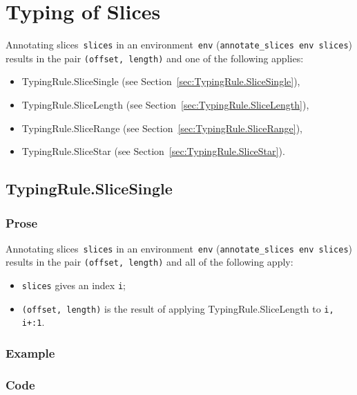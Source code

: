 \documentclass{book}
\begin{document}
\chapter{Typing of Slices}

Annotating slices~\texttt{slices} in an environment~\texttt{env}
(\texttt{annotate\_slices env slices}) results in the pair \texttt{(offset,
length)} and one of the following applies:
\begin{itemize}
\item TypingRule.SliceSingle (see Section~\ref{sec:TypingRule.SliceSingle}),
\item TypingRule.SliceLength (see Section~\ref{sec:TypingRule.SliceLength}),
\item TypingRule.SliceRange (see Section~\ref{sec:TypingRule.SliceRange}),
\item TypingRule.SliceStar (see Section~\ref{sec:TypingRule.SliceStar}).
\end{itemize}

\section{TypingRule.SliceSingle \label{sec:TypingRule.SliceSingle}}

  \subsection{Prose}
   Annotating slices~\texttt{slices} in an environment~\texttt{env}
(\texttt{annotate\_slices env slices}) results in the pair \texttt{(offset,
length)} and all of the following apply: 
   \begin{itemize}
   \item \texttt{slices} gives an index \texttt{i};
   \item \texttt{(offset, length)} is the result of applying TypingRule.SliceLength to \texttt{i, i+:1}.
   \end{itemize}

  \subsection{Example}

  \subsection{Code}
\end{document}
